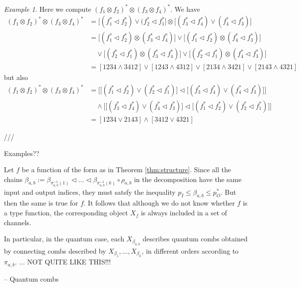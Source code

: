 \documentclass[12pt]{article}
\theoremstyle{definition}
\theoremstyle{remark}
\newtheorem{exm}{Example}
\def\vtl{\vartriangleleft}
\begin{document}
\begin{exm} Here we compute $(f_1\otimes f_2)^*\otimes (f_3\otimes f_4)^*$. We have
\begin{align*}
(f_1\otimes f_2)^*\otimes (f_3\otimes f_4)^*&= \bigl[(f_1^*\vtl f^*_2)\vee (f_2^*\vtl
f_1^*\bigr]\otimes \bigl[(f_3^*\vtl f^*_4)\vee (f_4^*\vtl
f_3^*)\bigr]\\
&= \bigl[(f_1^*\vtl f^*_2)\otimes (f_3^*\vtl f^*_4)\bigr]\vee \bigl[(f_1^*\vtl
f^*_2)\otimes (f_4^*\vtl f^*_3)\bigr]\\
&\quad \vee \bigl[(f_2^*\vtl f^*_1)\otimes (f_3^*\vtl
f^*_4)\bigr]\vee \bigl[(f_2^*\vtl f^*_1)\otimes (f_4^*\vtl f^*_3)\bigr]\\
&=[1234 \wedge 3412]\vee [1243\wedge 4312] \vee [2134\wedge 3421]\vee [2143\wedge 4321]
\end{align*}
but also
\begin{align*}
(f_1\otimes f_2)^*\otimes (f_3\otimes f_4)^*&= \biggl[\bigl[(f_1^*\vtl f^*_2)\vee (f_2^*\vtl
f_1^*)\bigr]\vtl  \bigl[(f_3^*\vtl f^*_4)\vee (f_4^*\vtl
f_3^*)\bigr]\biggr]\\
&\quad\wedge\biggl[\bigl[(f_3^*\vtl f^*_4)\vee (f_4^*\vtl
f_3^*)\bigr]\vtl  \bigl[(f_1^*\vtl f^*_2)\vee (f_2^*\vtl
f_1^*)\bigr]\biggr] \\
&= [1234\vee 2143]\wedge [3412\vee 4321]
\end{align*}




\end{exm}


///

Examples??

Let $f$ be a function of the form as in Theorem \ref{thm:structure}. Since all the chains
$\beta_{a,b}:=\beta_{\pi^{-1}_{a,b}(1)}\vtl \dots \vtl \beta_{\pi^{-1}_{a,b}(k)}\circ
\rho_{a,b}$ in the
decomposition have the same input and  output indices, they must satsfy the inequality
$p_{I}\le \beta_{a,b} \le p_{O}^*$. But then the same is true for $f$.
It follows that although we do not know whether $f$ is a type function, the corresponding
object $X_f$ is always included in a set of channels.

In particular, in the quantum case, each $X_{\beta_{a,b}}$ describes quantum combs  obtained by
connecting combs described by  $X_{\beta_1},\dots, X_{\beta_k}$, in different orders
according to $\pi_{a,b}$. ... NOT QUITE LIKE THIS!!!










-- Quantum combs
\end{document}
